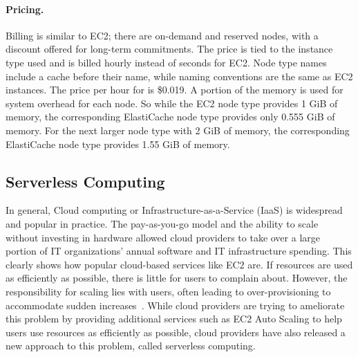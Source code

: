 \paragraph{Pricing.} Billing is similar to EC2; there are on-demand and reserved nodes, with a discount offered for long-term commitments. The price is tied to the instance type used and is billed hourly instead of seconds for EC2. Node type names include a cache before their name, while naming conventions are the same as EC2 instances. The price per hour for  is \$0.019. A portion of the memory is used for system overhead for each node. So while the EC2 node type  provides 1 GiB of memory, the corresponding ElastiCache node type  provides only 0.555 GiB of memory. For the next larger node type  with 2 GiB of memory, the corresponding ElastiCache node type provides 1.55 GiB of memory.


\subsection{Serverless Computing}
\label{subsec:lambda}
In general, Cloud computing or Infrastructure-as-a-Service (IaaS) is widespread and popular in practice. The pay-as-you-go model and the ability to scale without investing in hardware allowed cloud providers to take over a large portion of IT organizations' annual software and IT infrastructure spending. This clearly shows how popular cloud-based services like EC2 are. If resources are used as efficiently as possible, there is little for users to complain about. However, the responsibility for scaling lies with users, often leading to over-provisioning to accommodate sudden increases~\cite{castro_rise_2019}. While cloud providers are trying to ameliorate this problem by providing additional services such as EC2 Auto Scaling to help users use resources as efficiently as possible, cloud providers have also released a new approach to this problem, called serverless computing. 

